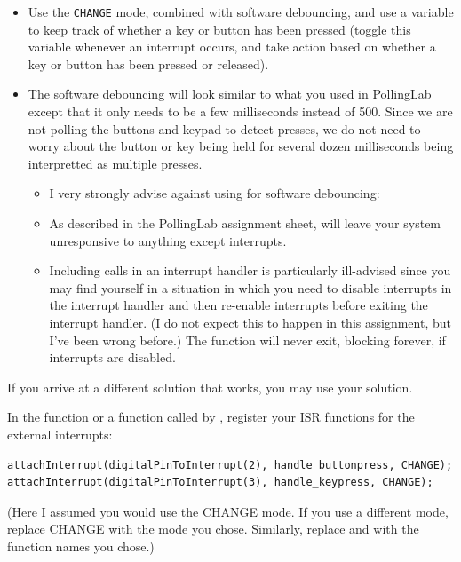     \begin{itemize}
    \item Use the \lstinline{CHANGE} mode, combined with software debouncing,
        and use a variable to keep track of whether a key or button has been
        pressed (toggle this variable whenever an interrupt occurs, and take
        action based on whether a key or button has been pressed or released).
    \item The software debouncing will look similar to what you used in
        PollingLab except that it only needs to be a few milliseconds instead
        of 500. Since we are not polling the buttons and keypad to detect
        presses, we do not need to worry about the button or key being held for
        several dozen milliseconds being interpretted as multiple presses.
        \begin{itemize}
        \item I very strongly advise against using  for
            software debouncing:
        \item As described in the PollingLab assignment sheet,
             will leave your system unresponsive to anything
            except interrupts.
        \item Including  calls in an interrupt handler is
            particularly ill-advised since you may find yourself in a situation
            in which you need to disable interrupts in the interrupt handler
            and then re-enable interrupts before exiting the interrupt handler.
            (I do not expect this to happen in this assignment, but I've been
            wrong before.) The  function will never exit,
            blocking forever, if interrupts are disabled.
        \end{itemize}
    \end{itemize}
If you arrive at a different solution that works, you may use your solution.

In the  function or a function called by ,
register your ISR functions for the external interrupts:
\begin{lstlisting}
attachInterrupt(digitalPinToInterrupt(2), handle_buttonpress, CHANGE);
attachInterrupt(digitalPinToInterrupt(3), handle_keypress, CHANGE);
\end{lstlisting}
(Here I assumed you would use the CHANGE mode. If you use a different mode,
replace CHANGE with the mode you chose. Similarly, replace
 and  with the function
names you chose.)


